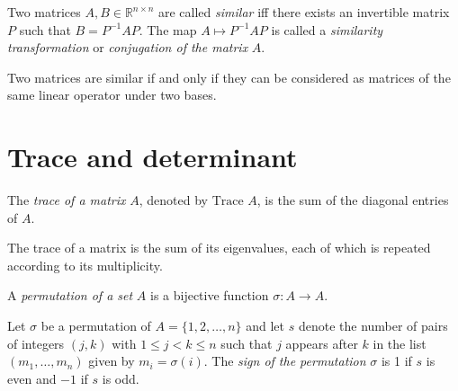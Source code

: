 \begin{defn}
  \label{def:similarMatrices}
  Two matrices $A, B\in \mathbb{R}^{n\times n}$
  are called \emph{similar} iff
  there exists an invertible matrix $P$
  such that $B=P^{-1}AP$.
  The map $A\mapsto P^{-1}AP$
  is called a \emph{similarity transformation}
  or \emph{conjugation of the matrix} $A$.
\end{defn}

\begin{rem}
  Two matrices are similar
  if and only if they can be considered
  as matrices of the same linear operator
  under two bases.
\end{rem}


\section{Trace and determinant}


\begin{defn}
  \label{def:trace}
  The \emph{trace of a matrix} $A$, denoted by $\text{Trace } A$,
  is the sum of the diagonal entries of $A$. 
\end{defn}

\begin{lem}
  \label{lem:trace}
  The trace of a matrix is the sum of its eigenvalues, 
  each of which is repeated according to its multiplicity.
\end{lem}


\begin{defn}
  A \emph{permutation of a set} $A$
  is a bijective function $\sigma: A \rightarrow A$.
\end{defn}

\begin{defn}
  \label{def:permutationSignature}
  Let $\sigma$ be a permutation of $A=\{1,2,\ldots, n\}$
  and 
  let $s$ denote the number of pairs of integers $(j,k)$ 
  with $1\le j < k \le n$ such that
  $j$ appears after $k$ in the list $(m_1, \ldots, m_n)$
  given by $m_i=\sigma(i)$.
  The \emph{sign of the permutation} $\sigma$
  is 1 if $s$ is even and $-1$ if $s$ is odd.
\end{defn}

